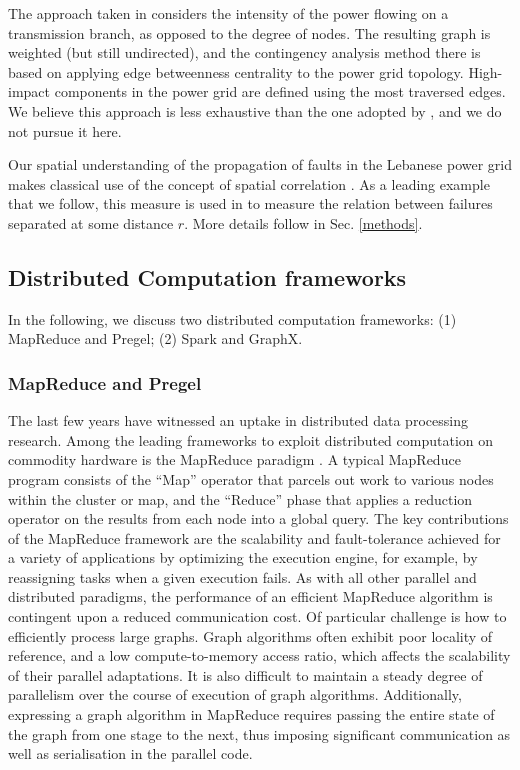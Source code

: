 The approach taken in \cite{JinAl10} considers the intensity of the power flowing on a transmission branch, as opposed to the degree of nodes. The resulting graph is weighted (but still undirected), and the contingency analysis method there is based on applying edge betweenness centrality \cite{GirvanAl02} to the power grid topology. High-impact components in the power grid are defined using the most traversed edges. We believe this approach is less exhaustive than the one adopted by \cite{2000Natur.406..378A}, and we do not pursue it here.

Our spatial understanding of the propagation of faults in the Lebanese power grid makes classical use of the concept of spatial correlation \cite{CavagnaAl10, MakseAl95}. As a leading example that we follow, this measure is used in \cite{DaqingAl14} to measure the relation between failures separated at some distance $r$. More details follow in Sec. \ref{methods}.


\subsection{Distributed Computation frameworks}
\label{distcomp}
In the following, we discuss two distributed computation frameworks: (1) MapReduce and Pregel; (2) Spark and GraphX.

\subsubsection{MapReduce and Pregel}
The last few years have witnessed an uptake in distributed data processing research. Among the leading frameworks to exploit distributed computation on commodity hardware is the MapReduce paradigm \cite{mapreduce}. A typical MapReduce program consists of the ``Map'' operator that parcels out work to various nodes within the cluster or map, and the ``Reduce'' phase that applies a reduction operator on the results from each node into a global query. The key contributions of the MapReduce framework are the scalability and fault-tolerance achieved for a variety of applications by optimizing the execution engine, for example, by reassigning tasks when a given execution fails. As with all other parallel and distributed paradigms, the performance of an efficient MapReduce algorithm is contingent upon a reduced communication cost. Of particular challenge is how to efficiently process large graphs. Graph algorithms often exhibit poor locality of reference, and a low compute-to-memory access ratio, which affects the scalability of their parallel adaptations. It is also difficult to maintain a steady degree of parallelism over the course of execution of graph algorithms. Additionally, expressing a graph algorithm in MapReduce requires passing the entire state of the graph from one stage to the next, thus imposing significant communication as well as serialisation in the parallel code. 

